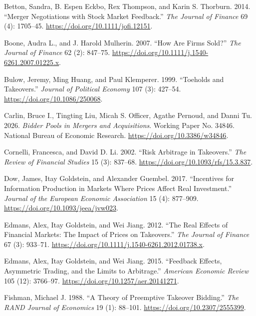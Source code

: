 \documentclass[
  12pt,
]{article}
\newlength{\cslhangindent}
\newenvironment{CSLReferences}[2] %
 {\begin{list}{}{%
  \setlength{\itemindent}{0pt}
  \setlength{\leftmargin}{0pt}
  \setlength{\parsep}{0pt}
  \ifodd #1
   \setlength{\leftmargin}{\cslhangindent}
   \setlength{\itemindent}{-1\cslhangindent}
  \fi
  \setlength{\itemsep}{#2\baselineskip}}}
 {\end{list}}
\begin{document}
\protect{}\label{refs}
\begin{CSLReferences}{1}{1}
Betton, Sandra, B. Espen Eckbo, Rex Thompson, and Karin S. Thorburn.
2014. {``Merger Negotiations with Stock Market Feedback.''} \emph{The
Journal of Finance} 69 (4): 1705--45.
\url{https://doi.org/10.1111/jofi.12151}.

Boone, Audra L., and J. Harold Mulherin. 2007. {``How Are Firms Sold?''}
\emph{The Journal of Finance} 62 (2): 847--75.
\url{https://doi.org/10.1111/j.1540-6261.2007.01225.x}.

Bulow, Jeremy, Ming Huang, and Paul Klemperer. 1999. {``Toeholds and
Takeovers.''} \emph{Journal of Political Economy} 107 (3): 427--54.
\url{https://doi.org/10.1086/250068}.

Carlin, Bruce I., Tingting Liu, Micah S. Officer, Agathe Pernoud, and
Danni Tu. 2026. \emph{Bidder Pools in Mergers and Acquisitions}. Working
Paper No. 34846. National Bureau of Economic Research.
\url{https://doi.org/10.3386/w34846}.

Cornelli, Francesca, and David D. Li. 2002. {``Risk Arbitrage in
Takeovers.''} \emph{The Review of Financial Studies} 15 (3): 837--68.
\url{https://doi.org/10.1093/rfs/15.3.837}.

Dow, James, Itay Goldstein, and Alexander Guembel. 2017. {``Incentives
for Information Production in Markets Where Prices Affect Real
Investment.''} \emph{Journal of the European Economic Association} 15
(4): 877--909. \url{https://doi.org/10.1093/jeea/jvw023}.

Edmans, Alex, Itay Goldstein, and Wei Jiang. 2012. {``The Real Effects
of Financial Markets: The Impact of Prices on Takeovers.''} \emph{The
Journal of Finance} 67 (3): 933--71.
\url{https://doi.org/10.1111/j.1540-6261.2012.01738.x}.

Edmans, Alex, Itay Goldstein, and Wei Jiang. 2015. {``Feedback Effects,
Asymmetric Trading, and the Limits to Arbitrage.''} \emph{American
Economic Review} 105 (12): 3766--97.
\url{https://doi.org/10.1257/aer.20141271}.

Fishman, Michael J. 1988. {``A Theory of Preemptive Takeover Bidding.''}
\emph{The RAND Journal of Economics} 19 (1): 88--101.
\url{https://doi.org/10.2307/2555399}.


\end{CSLReferences}
\end{document}
